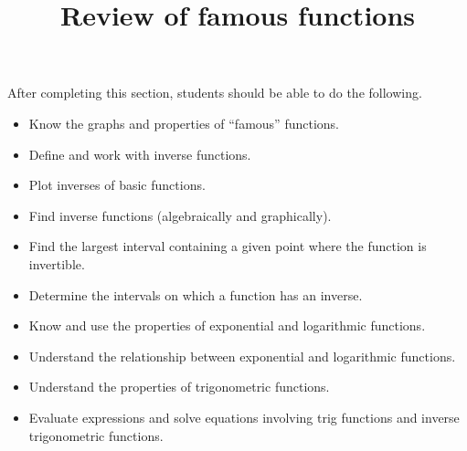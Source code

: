 \documentclass{ximera}
\title{Review of famous functions}
\begin{document}
\begin{abstract} 
\end{abstract}

\maketitle

\begin{sectionOutcomes}
After completing this section, students should be able to do the following.

\begin{itemize}
	\item Know the graphs and properties of ``famous'' functions.
	\item Define and work with inverse functions.
        \item Plot inverses of basic functions.
	\item Find inverse functions (algebraically and graphically).
          \item Find the largest interval containing a given point
            where the function is invertible.
	\item Determine the intervals on which a function has an inverse.
	\item Know and use the properties of exponential and logarithmic functions.
	\item Understand the relationship between exponential and logarithmic functions.
	\item Understand the properties of trigonometric functions.
	\item Evaluate expressions and solve equations involving trig
          functions and inverse trigonometric functions.
\end{itemize}
\end{sectionOutcomes}
\end{document}
